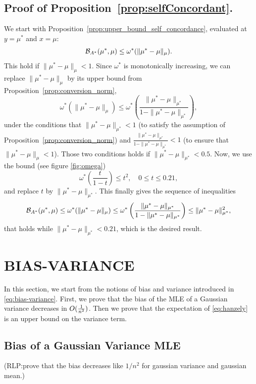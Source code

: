 \documentclass[twoside]{article}
\newcommand{\rlp}[1]{\textcolor{BrickRed}{(RLP:#1)}}
\newcommand{\logpart}{A}
\newcommand{\bregmanconj}{\cB_{\logpart^*}}
\newcommand{\m}{\mu}
\newcommand{\meanp}{\m}
\begin{document}
\subsection{Proof of Proposition~\ref{prop:selfConcordant}.}

We start with Proposition~\ref{prop:upper_bound_self_concordance}, evaluated at $y=\meanp^*$ and $x=\meanp$:
\[
	\bregmanconj(\meanp^*,\meanp) \leq \omega^*(\|\meanp^*-\meanp\|_{\meanp}).
\]
This hold if $\|\meanp^*-\meanp\|_{\meanp}<1$. Since $\omega^*$ is monotonically increasing, we can replace $\|\meanp^*-\meanp\|_{\meanp}$ by its upper bound from Proposition~\ref{prop:conversion_norm},
\[
	\omega^*(\|\meanp^*-\meanp\|_{\meanp}) \leq \omega^*\left(\frac{\|\meanp^*-\meanp\|_{\meanp^*}}{1-\|\meanp^*-\meanp\|_{\meanp^*}}\right),
\]
under the conditions that $\|\meanp^*-\meanp\|_{\meanp^*}<1$ (to satisfy the assumption of Proposition~\ref{prop:conversion_norm}) and $\frac{\|\meanp^*-\meanp\|_{\meanp^*}}{1-\|\meanp^*-\meanp\|_{\meanp^*}} <1$ (to ensure that $\|\meanp^*-\meanp\|_{\meanp} <1$). Those two conditions holds if $\|\meanp^*-\meanp\|_{\meanp^*} <0.5$. Now, we use the bound (see figure \ref{fig:omega})
\[
	\omega^*\left(\frac{t}{1-t}\right) \leq t^2, \quad 0\leq t \leq 0.21,
\]
and replace $t$ by $\|\meanp^*-\meanp\|_{\meanp^*}$. This finally gives the sequence of inequalities
\[
	\bregmanconj(\meanp^*,\meanp) \leq \omega^*(\|\meanp^*-\meanp\|_{\meanp}) \leq \omega^*\left(\frac{\|\meanp^*-\meanp\|_{\meanp^*}}{1-\|\meanp^*-\meanp\|_{\meanp^*}}\right) \leq \|\meanp^*-\meanp\|_{\meanp^*}^2,
\]
that holds while $ \|\meanp^*-\meanp\|_{\meanp^*}<0.21$, which is the desired result.



\section{BIAS-VARIANCE}
\label{app:bias-variance}
In this section, we start from the notions of bias and variance introduced in \cref{eq:bias-variance}.
First, we prove that the bias of the MLE of a Gaussian variance decreases in $O(\frac{1}{n^2})$. 
Then we prove that the expectation of \cref{eq:hanzely} is an upper bound on the variance term.

\subsection{Bias of a Gaussian Variance MLE}
\rlp{prove that the bias decreases like $1/n^2$ for gaussian variance and gaussian mean.}
\end{document}
